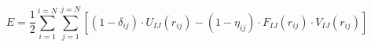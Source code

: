 \documentclass[12pt]{article}
\begin{document}
$$
E=\frac{1}{2}\sum_{i=1}^{i=N}\sum_{j=1}^{j=N}\left[\left(1-\delta_{ij}\right)\cdot U_{IJ}\left(r_{ij}\right)-\left(1-\eta_{ij}\right)\cdot F_{IJ}\left(r_{ij}\right)\cdot V_{IJ}\left(r_{ij}\right)\right]
$$
\end{document}
